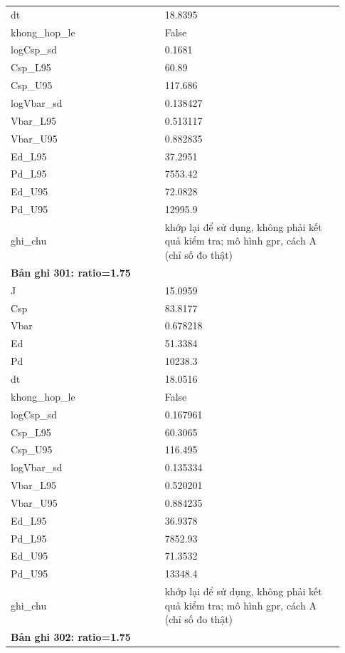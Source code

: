 \begin{longtable}{p{0.43\linewidth}p{0.50\linewidth}}
dt & 18.8395 \\
khong\_\allowbreak hop\_\allowbreak le & False \\
logCsp\_\allowbreak sd & 0.1681 \\
Csp\_\allowbreak L95 & 60.89 \\
Csp\_\allowbreak U95 & 117.686 \\
logVbar\_\allowbreak sd & 0.138427 \\
Vbar\_\allowbreak L95 & 0.513117 \\
Vbar\_\allowbreak U95 & 0.882835 \\
Ed\_\allowbreak L95 & 37.2951 \\
Pd\_\allowbreak L95 & 7553.42 \\
Ed\_\allowbreak U95 & 72.0828 \\
Pd\_\allowbreak U95 & 12995.9 \\
ghi\_\allowbreak chu & khớp lại để sử dụng, không phải kết quả kiểm tra; mô hình gpr, cách A (chỉ số đo thật) \\
\midrule
\multicolumn{2}{p{0.95\linewidth}}{\textbf{Bản ghi 301: ratio=1.75}} \\
J & 15.0959 \\
Csp & 83.8177 \\
Vbar & 0.678218 \\
Ed & 51.3384 \\
Pd & 10238.3 \\
dt & 18.0516 \\
khong\_\allowbreak hop\_\allowbreak le & False \\
logCsp\_\allowbreak sd & 0.167961 \\
Csp\_\allowbreak L95 & 60.3065 \\
Csp\_\allowbreak U95 & 116.495 \\
logVbar\_\allowbreak sd & 0.135334 \\
Vbar\_\allowbreak L95 & 0.520201 \\
Vbar\_\allowbreak U95 & 0.884235 \\
Ed\_\allowbreak L95 & 36.9378 \\
Pd\_\allowbreak L95 & 7852.93 \\
Ed\_\allowbreak U95 & 71.3532 \\
Pd\_\allowbreak U95 & 13348.4 \\
ghi\_\allowbreak chu & khớp lại để sử dụng, không phải kết quả kiểm tra; mô hình gpr, cách A (chỉ số đo thật) \\
\midrule
\multicolumn{2}{p{0.95\linewidth}}{\textbf{Bản ghi 302: ratio=1.75}} \\

\end{longtable}
